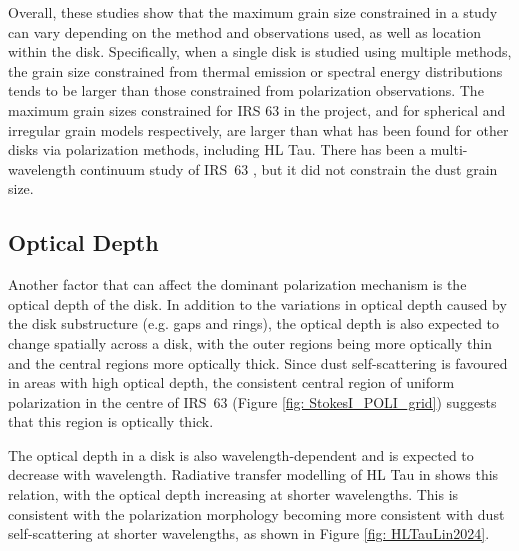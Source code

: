 Overall, these studies show that the maximum grain size constrained in a study can vary depending on the method and observations used, as well as location within the disk. Specifically, when a single disk is studied using multiple methods, the grain size constrained from thermal emission or spectral energy distributions tends to be larger than those constrained from polarization observations. The maximum grain sizes constrained for IRS 63 in the project, \sbest and \ibest for spherical and irregular grain models respectively, are larger than what has been found for other disks via polarization methods, including HL Tau. There has been a multi-wavelength continuum study of IRS~63 \citep{Maureira2026}, but it did not constrain the dust grain size. 






\subsection{Optical Depth}



Another factor that can affect the dominant polarization mechanism is the optical depth of the disk. In addition to the variations in optical depth caused by the disk substructure (e.g. gaps and rings), the optical depth is also expected to change spatially across a disk, with the outer regions being more optically thin and the central regions more optically thick. Since dust self-scattering is favoured in areas with high optical depth, the consistent central region of uniform polarization in the centre of IRS~63 (Figure \ref{fig: StokesI_POLI_grid}) suggests that this region is optically thick. 


The optical depth in a disk is also wavelength-dependent and is expected to decrease with wavelength. Radiative transfer modelling of HL Tau in \cite{Carrasco} shows this relation, with the optical depth increasing at shorter wavelengths. This is consistent with the polarization morphology becoming more consistent with dust self-scattering at shorter wavelengths, as shown in Figure \ref{fig: HLTauLin2024}.


